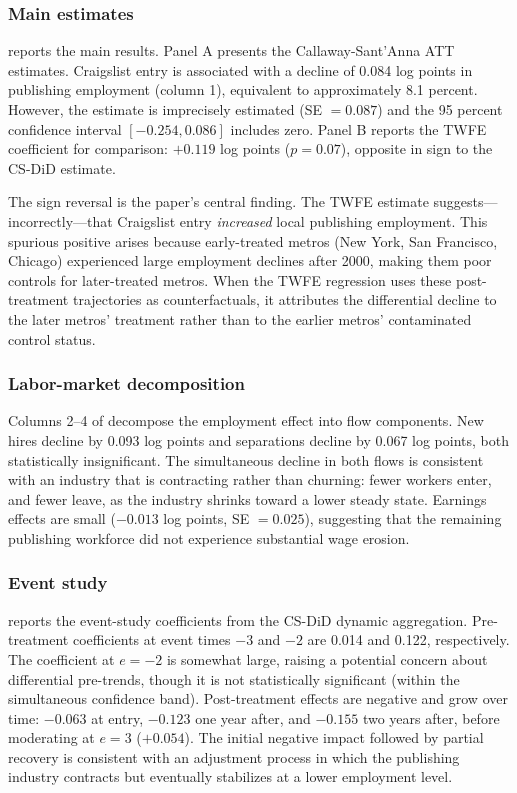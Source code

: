 \documentclass[12pt]{article}
\begin{document}
\subsubsection*{Main estimates}  reports the main results. Panel A presents the Callaway-Sant'Anna ATT estimates. Craigslist entry is associated with a decline of 0.084 log points in publishing employment (column 1), equivalent to approximately 8.1 percent. However, the estimate is imprecisely estimated (SE $= 0.087$) and the 95 percent confidence interval $[-0.254, 0.086]$ includes zero. Panel B reports the TWFE coefficient for comparison: $+0.119$ log points ($p = 0.07$), opposite in sign to the CS-DiD estimate.

The sign reversal is the paper's central finding. The TWFE estimate suggests---incorrectly---that Craigslist entry \emph{increased} local publishing employment. This spurious positive arises because early-treated metros (New York, San Francisco, Chicago) experienced large employment declines after 2000, making them poor controls for later-treated metros. When the TWFE regression uses these post-treatment trajectories as counterfactuals, it attributes the differential decline to the later metros' treatment rather than to the earlier metros' contaminated control status.

\subsubsection*{Labor-market decomposition} Columns 2--4 of  decompose the employment effect into flow components. New hires decline by 0.093 log points and separations decline by 0.067 log points, both statistically insignificant. The simultaneous decline in both flows is consistent with an industry that is contracting rather than churning: fewer workers enter, and fewer leave, as the industry shrinks toward a lower steady state. Earnings effects are small ($-0.013$ log points, SE $= 0.025$), suggesting that the remaining publishing workforce did not experience substantial wage erosion.



\subsubsection*{Event study}  reports the event-study coefficients from the CS-DiD dynamic aggregation. Pre-treatment coefficients at event times $-3$ and $-2$ are 0.014 and 0.122, respectively. The coefficient at $e = -2$ is somewhat large, raising a potential concern about differential pre-trends, though it is not statistically significant (within the simultaneous confidence band). Post-treatment effects are negative and grow over time: $-0.063$ at entry, $-0.123$ one year after, and $-0.155$ two years after, before moderating at $e = 3$ ($+0.054$). The initial negative impact followed by partial recovery is consistent with an adjustment process in which the publishing industry contracts but eventually stabilizes at a lower employment level.
\end{document}
